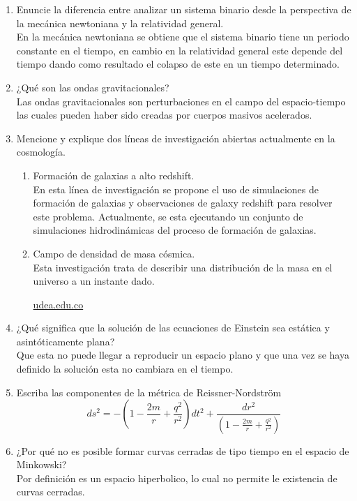 \documentclass[12pt,letterpaper]{report}
\begin{document}
\begin{enumerate}
    \item Enuncie la diferencia entre analizar un sistema binario desde la perspectiva de la mecánica newtoniana y la relatividad general.\\
    En la mecánica newtoniana se obtiene que el sistema binario tiene un periodo constante en el tiempo, en cambio en la relatividad general este depende del tiempo dando como resultado el colapso de este en un tiempo determinado.
    \item ¿Qué son las ondas gravitacionales?\\
    Las ondas gravitacionales son perturbaciones en el campo del espacio-tiempo las cuales pueden haber sido creadas por cuerpos masivos acelerados.
    \item Mencione y explique dos líneas de investigación abiertas actualmente en la cosmología.
    \begin{enumerate}
        \item Formación de galaxias a alto redshift.\\
        En esta línea de investigación se propone el uso de simulaciones de formación de galaxias y observaciones de galaxy redshift para resolver este problema. Actualmente, se esta ejecutando un conjunto de simulaciones hidrodinámicas del proceso de formación de galaxias.
        \item Campo de densidad de masa cósmica.\\
        Esta investigación trata de describir una distribución de la masa en el universo a un instante dado.\\
        \begin{center}
        \href{http://www.udea.edu.co/wps/portal/udea/web/inicio/investigacion/grupos-investigacion/ciencias-naturales-exactas/facom/lineas-investigacion}{udea.edu.co}
        \end{center}
    \end{enumerate}
    \item ¿Qué significa que la solución de las ecuaciones de Einstein sea estática y asintóticamente plana?\\
    Que esta no puede llegar a reproducir un espacio plano y que una vez se haya definido la solución esta no cambiara en el tiempo.
    \item Escriba las componentes de la métrica de Reissner-Nordstr\"om\\
    \begin{equation*}
        ds^2 = - \left(1-\frac{2m}{r}+\frac{q^2}{r^2}\right)dt^2 + \frac{dr^2}{\left(1-\frac{2m}{r}+\frac{q^2}{r^2}\right)}
    \end{equation*}
    \item ¿Por qué no es posible formar curvas cerradas de tipo tiempo en el espacio de Minkowski?\\
    Por definición es un espacio hiperbolico, lo cual no permite le existencia de curvas cerradas.
\end{enumerate}
\end{document}
